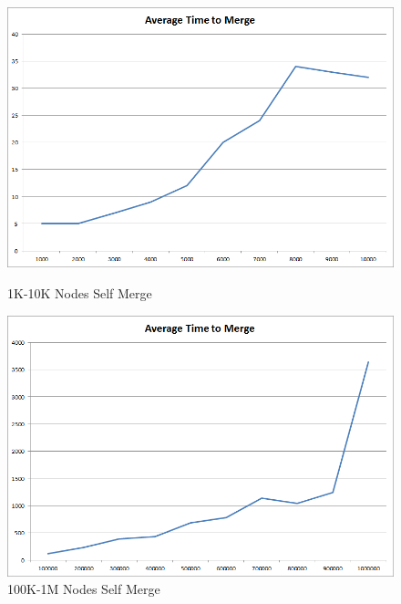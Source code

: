 \begin{figure}[ht]
\begin{minipage}[b]{0.45\linewidth}
\centering
\includegraphics[width=\textwidth]{media/chapter5/perf/selfmerge_10K.png}
\caption{1K-10K Nodes Self Merge}
\label{fig:pic1}
\end{minipage}
\hspace{0.5cm}
\begin{minipage}[b]{0.45\linewidth}
\centering
\includegraphics[width=\textwidth]{media/chapter5/perf/selfmerge_1M.png}
\caption{100K-1M Nodes Self Merge}
\label{fig:pic2}
\end{minipage}
\end{figure}

